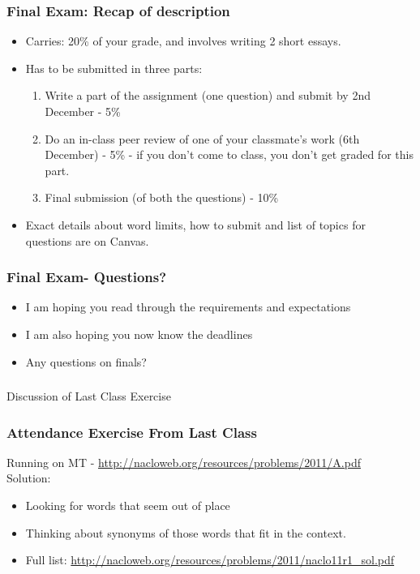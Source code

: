 \documentclass{beamer}
\begin{document}
\begin{frame}
\frametitle{Final Exam: Recap of description}
\begin{itemize}
\item Carries: 20\% of your grade, and involves writing 2 short essays. 
\item Has to be submitted in three parts:
\begin{enumerate}
\item Write a part of the assignment (one question) and submit by 2nd December - 5\%
\item Do an in-class peer review of one of your classmate's work (6th December) - 5\% - if you don't come to class, you don't get graded for this part.
\item Final submission (of both the questions) - 10\%
\end{enumerate}
\item Exact details about word limits, how to submit and list of topics for questions are on Canvas. 
\end{itemize}
\end{frame}

\begin{frame}
\frametitle{Final Exam- Questions?}
\begin{itemize}
\item I am hoping you read through the requirements and expectations
\item I am also hoping you now know the deadlines
\item Any questions on finals?
\end{itemize}
\end{frame}

\begin{frame}
\frametitle{}
\Large Discussion of Last Class Exercise
\end{frame}

\begin{frame}
\frametitle{Attendance Exercise From Last Class}
Running on MT - \url{http://nacloweb.org/resources/problems/2011/A.pdf} \\
\medskip
Solution: 
\begin{itemize}
\item Looking for words that seem out of place
\item Thinking about synonyms of those words that fit in the context.
\item Full list: \url{http://nacloweb.org/resources/problems/2011/naclo11r1_sol.pdf}
\end{itemize}
\end{frame}
\end{document}

